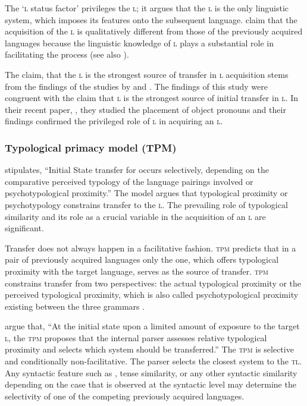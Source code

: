 \documentclass[output=paper,
modfonts
]{langscibook}
\begin{document}
The ‘\textsc{l} status factor’ \citep{BardelFalk2007} privileges the \textsc{l}; it argues that the \textsc{l} is the only linguistic system, which imposes its features onto the subsequent language. \citet{BardelFalk2007} claim that the acquisition of the \textsc{l} is qualitatively different from those of the previously acquired languages because the linguistic knowledge of \textsc{l} plays a substantial role in facilitating the process (see also \citealt{Hufeisen1998,CenozJessner2000,Cenoz2001,Cenoz2003}).      

The claim, that the \textsc{l} is the strongest source of transfer in \textsc{l} acquisition stems from the findings of the studies by  \citet{BardelFalk2007} and \citet{FalkBardel2011}. The findings of this study were congruent with the claim that \textsc{l} is the strongest source of initial transfer in \textsc{l}. In their recent paper, \citet{FalkBardel2011}, they studied the placement of object pronouns and their findings confirmed the privileged role of \textsc{l} in acquiring an \textsc{l}.

\subsubsection{Typological primacy model (TPM)}

\citet[233]{Rothman2011} stipulates, “Initial State transfer for  occurs selectively, depending on the comparative perceived typology of the language pairings involved or psychotypological proximity.” The model argues that typological proximity or psychotypology constrains transfer to the \textsc{l}. The prevailing role of typological similarity and its role as a crucial variable in the acquisition of an \textsc{l} are significant. 

 Transfer does not always happen in a facilitative fashion. \textsc{tpm} predicts that in a pair of previously acquired languages only the one, which offers typological proximity with the target language, serves as the source of transfer. \textsc{tpm} constrains transfer from two perspectives: the actual typological proximity or the perceived typological proximity, which is also called psychotypological proximity existing between the three grammars \citep[19]{GarcíaMayoRothman2012}.

\citet[19]{GarcíaMayoRothman2012} argue that, “At the initial state upon a limited amount of exposure to the target \textsc{l}, the \textsc{tpm} proposes that the internal parser assesses relative typological proximity and selects which system should be transferred.” The \textsc{tpm} is selective and conditionally non-facilitative. The parser selects the closest system to the \textsc{tl}. Any syntactic feature such as , tense similarity, or any other syntactic similarity depending on the case that is observed at the syntactic level may determine the selectivity of one of the competing previously acquired languages.
\end{document}
